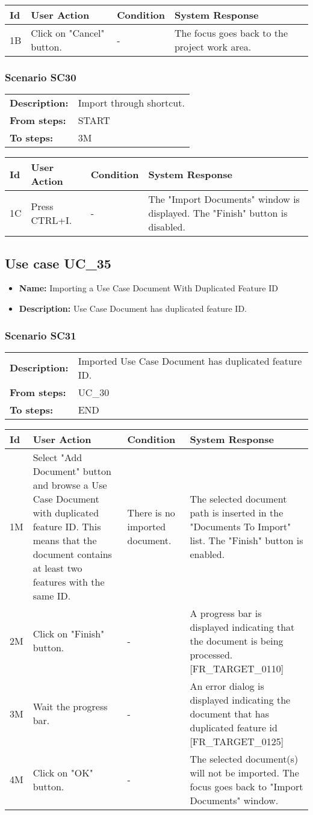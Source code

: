 \documentclass[a4paper,11pt]{article}
\newcommand{\bl}{\\ \hline}
\begin{document}
\begin{tabular}{|p{0.8in}|p{1.6in}|p{1.6in}|p{1.6in}|}
\hline
Id & User Action & Condition & System Response  \bl 
1B & Click on "Cancel" button. & - & The focus goes back to the project work area. \bl 
\end{tabular}
\subsubsection*{Scenario SC30}
\begin{tabular}{p{1in}p{4in}}
{\bf Description:} & Import through shortcut. \\
{\bf From steps:} & START \\
{\bf To steps:} & 3M \\
\end{tabular}
 
\begin{tabular}{|p{0.8in}|p{1.6in}|p{1.6in}|p{1.6in}|}
\hline
Id & User Action & Condition & System Response  \bl 
1C & Press CTRL+I. & - & The "Import Documents" window is displayed. The "Finish"
						button is disabled. \bl 
\end{tabular}
\subsection*{Use case UC_35}
\begin{itemize}
\item {\bf Name: }Importing a Use Case Document With Duplicated Feature ID
\item {\bf Description: }Use Case Document has duplicated feature ID.
			
\end{itemize}
\subsubsection*{Scenario SC31}
\begin{tabular}{p{1in}p{4in}}
{\bf Description:} & Imported Use Case Document has duplicated feature ID.
				 \\
{\bf From steps:} & UC_30#2M \\
{\bf To steps:} & END \\
\end{tabular}
 
\begin{tabular}{|p{0.8in}|p{1.6in}|p{1.6in}|p{1.6in}|}
\hline
Id & User Action & Condition & System Response  \bl 
1M & Select "Add Document" button and browse a Use Case Document
						with duplicated feature ID. This means that the document contains
						at least two features with the same ID.  & There is no imported document. & The selected document path is inserted in the "Documents
						To Import" list. The "Finish" button is enabled. \bl 
2M & Click on "Finish" button. & - & A progress bar is displayed indicating that the document
						is being processed. [FR_TARGET_0110]  \bl 
3M & Wait the progress bar.  & - & An error dialog is displayed indicating the document that
						has duplicated feature id [FR_TARGET_0125] \bl 
4M & Click on "OK" button. & - & The selected document(s) will not be imported. The focus
						goes back to "Import Documents" window. \bl 
\end{tabular}
\end{document}
